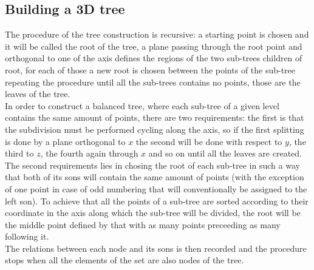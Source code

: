 \subsection{Building a 3D tree}
The procedure of the tree construction is recursive: a starting point is chosen and it will be called the root of the tree, a plane passing through the root point and orthogonal to one of the axis defines the regions of the two sub-trees children of root, for each of those a new root is chosen between the points of the sub-tree repeating the procedure until all the sub-trees contains no points, those are the leaves of the tree.\\
In order to construct a balanced tree, where each sub-tree of a given level contains the same amount of points, there are two requirements: the first is that the subdivision must be performed cycling along the axis, so if the first splitting is done by a plane orthogonal to $x$ the second will be done with respect to $y$, the third to $z$, the fourth again through $x$ and so on until all the leaves are created.\\
The second requirements lies in chosing the root of each sub-tree in such a way that both of its sons will contain the same amount of points (with the exception of one point in case of odd numbering that will conventionally be assigned to the left son). To achieve that all the points of a sub-tree are sorted according to their coordinate in the axis along which the sub-tree will be divided, the root will be the middle point defined by that with as many points preceeding as many following it.\\
The relations between each node and its sons is then recorded and the procedure stops when all the elements of the set are also nodes of the tree.

